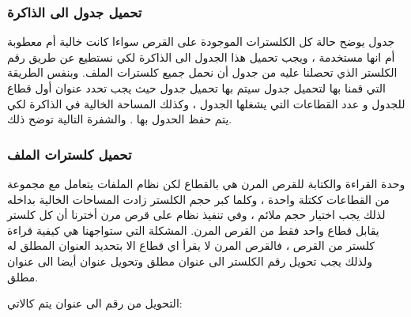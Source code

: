 \documentclass[document.tex]{subfiles}
\begin{document}
\subsubsection{تحميل جدول  الى الذاكرة}
جدول  يوضح حالة كل الكلسترات الموجودة على القرص سواءا كانت خالية أم معطوبة أم انها مستخدمة ، ويجب تحميل هذا الجدول الى الذاكرة لكي نستطيع عن طريق رقم الكلستر الذي تحصلنا عليه من جدول  أن نحمل جميع كلسترات الملف.
وبنفس الطريقة التي قمنا بها لتحميل جدول  سيتم بها تحميل جدول  حيث يجب تحدد عنوان أول قطاع للجدول و عدد القطاعات التي يشغلها الجدول ، وكذلك المساحة الخالية في الذاكرة لكي يتم حفظ الحدول بها . والشفرة التالية توضح ذلك.

\begin{english}
\lstset{numberstyle=\tiny,numbersep=5pt,tabsize=2,extendedchars=true,breaklines=true,frame=b,showspaces=false, showtabs=false,xleftmargin=10pt,framexleftmargin=10pt,framexrightmargin=5pt,framexbottommargin=4pt,showstringspaces=false,language=[x86masm]Assembler}


\end{english}

\subsubsection{تحميل كلسترات الملف}
وحدة القراءة والكتابة للقرص المرن هي بالقطاع  لكن نظام الملفات  يتعامل مع مجموعة من القطاعات ككتلة واحدة ، وكلما كبر حجم الكلستر زادت المساحات الخالية بداخله  لذلك يجب اختيار حجم ملائم ، وفي تنفيذ نظام  على قرص مرن أخترنا أن كل كلستر يقابل قطاع واحد فقط من القرص المرن.
المشكلة التي ستواجهنا هي كيفية قراءة كلستر من القرص ، فالقرص المرن لا يقرأ اي قطاع الا بتحديد العنوان المطلق له  ولذلك يجب تحويل رقم الكلستر الى عنوان مطلق وتحويل عنوان  أيضا الى عنوان مطلق.

التحويل من رقم  الى عنوان  يتم كالاتي:

\begin{english}
\lstset{numberstyle=\tiny,numbersep=5pt,tabsize=2,extendedchars=true,breaklines=true,frame=b,showspaces=false, showtabs=false,xleftmargin=10pt,framexleftmargin=10pt,framexrightmargin=5pt,framexbottommargin=4pt,showstringspaces=false,language=[x86masm]Assembler}


\end{english}
\end{document}
